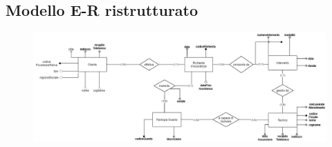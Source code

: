\documentclass[legalpaper]{article}
\begin{document}
\subsection{Modello E-R ristrutturato}
\begin{figure}[!ht]
	\centering
	\includegraphics[width=0.9\linewidth]{image/er_ristrutturato}
	\caption{}
	\label{fig:erristrutturato}
\end{figure}
\newpage
\end{document}
